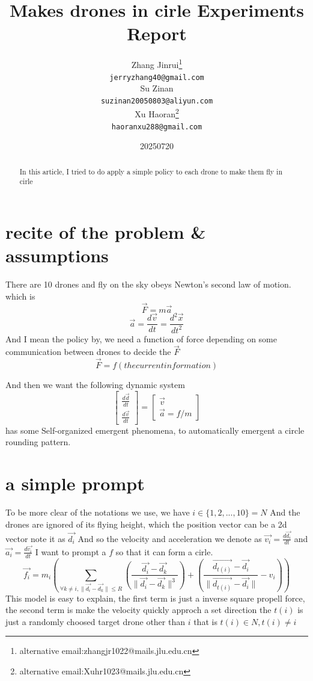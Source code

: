 \documentclass{article}
\title{Makes drones in cirle Experiments Report}
\author{
Zhang Jinrui\thanks{alternative email:zhangjr1022@mails.jlu.edu.cn} \\ \texttt{jerryzhang40@gmail.com}
\\Su Zinan \\ \texttt{suzinan20050803@aliyun.com}
\\Xu Haoran\thanks{alternative email:Xuhr1023@mails.jlu.edu.cn} \\ \texttt{haoranxu288@gmail.com}
}
\date{20250720}  %
\theoremstyle{definition} %
\begin{document}
\maketitle

\begin{abstract}
    In this article, I tried to do apply a
    simple policy to each drone to make
    them fly in cirle
\end{abstract}

\section{recite of the problem \& assumptions}
There are 10 drones and fly on the sky
obeys Newton's second law of motion.
which is
\[
    \vec{F} = m \vec{a}
\]
\[
    \vec{a} = \frac{d\vec{v}}{dt} = \frac{d^2 \vec{x}}{dt^2}
\]
And I mean the policy by, we need a function of force
depending on some communication between drones
to decide the \(\vec{F}\)
\[
    \vec{F}=f(the current information)
\]

And then we want the following dynamic system
\[\begin{bmatrix}
        \frac{d\vec{d}}{dt} \\
        \frac{d\vec{v}}{dt}
    \end{bmatrix}=
    \begin{bmatrix}
        \vec{v} \\
        \vec{a}=f/m
    \end{bmatrix}
\]
has some Self-organized emergent phenomena,
to automatically emergent a circle rounding pattern.

\section{a simple prompt}
To be more clear of the notations we use,
we have \(i\in\{1,2,...,10\}=N\)
And the drones are ignored of its flying
height, which the position vector can be a
2d vector note it as \(\vec{d_i}\)
And so the velocity and acceleration we denote as
\(\vec{v_i}=\frac{d\vec{d_i}}{dt}\)
and
\(\vec{a_i}=\frac{d\vec{v_i}}{dt}\)
I want to prompt a \(f\) so that it can form
a cirle.
\[
    \vec{f_i}=m_i(\sum_{\forall k\neq i,\|\vec{d_i}-\vec{d_k}\|\leq R}(\frac{\vec{d_i}-\vec{d_k}}{\|\vec{d_i}-\vec{d_k}\|^3})+(\frac{\vec{d_{t(i)}}-\vec{d_i}}{\|\vec{d_{t(i)}}-\vec{d_i}\|}-v_i))
\]
This model is easy to explain, the first term is
just a inverse square propell force, the second
term is make the velocity quickly approch a set direction
the \(t(i)\) is just a randomly choosed target drone
other than \(i\) that is \(t(i)\in N, t(i)\neq i\)
\end{document}
